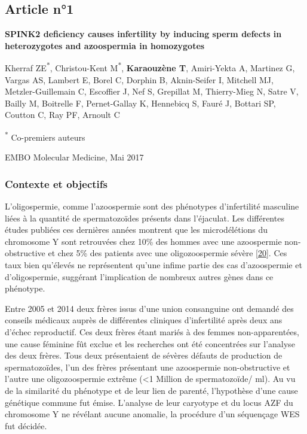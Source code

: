 \documentclass[12pt,a4paper,twoside]{ugathesis}
\begin{document}
\newpage

\newpage  

\subsection{Article n°1}\label{article-n1}

\textbf{SPINK2 deficiency causes infertility by inducing sperm defects
in heterozygotes and azoospermia in homozygotes}

Kherraf ZE\textsuperscript{*}, Christou-Kent M\textsuperscript{*},
\textbf{Karaouzène T}, Amiri-Yekta A, Martinez G, Vargas AS, Lambert E,
Borel C, Dorphin B, Aknin-Seifer I, Mitchell MJ, Metzler-Guillemain C,
Escoffier J, Nef S, Grepillat M, Thierry-Mieg N, Satre V, Bailly M,
Boitrelle F, Pernet-Gallay K, Hennebicq S, Fauré J, Bottari SP, Coutton
C, Ray PF, Arnoult C

\textsuperscript{*} Co-premiers auteurs

EMBO Molecular Medicine, Mai 2017

\newpage

\subsubsection{Contexte et objectifs}\label{contexte-et-objectifs}

L'oligospermie, comme l'azoospermie sont des phénotypes d'infertilité
masculine liées à la quantité de spermatozoïdes présents dans
l'éjaculat. Les différentes études publiées ces dernières années
montrent que les microdélétions du chromosome Y sont retrouvées chez
10\% des hommes avec une azoospermie non-obstructive et chez 5\% des
patients avec une oligozoospermie sévère
{[}\protect\hyperlink{ref-Hotaling2014}{20}{]}. Ces taux bien qu'élevés
ne représentent qu'une infime partie des cas d'azoospermie et
d'oligospermie, suggérant l'implication de nombreux autres gènes dans ce
phénotype.

Entre 2005 et 2014 deux frères issus d'une union consanguine ont demandé
des conseils médicaux auprès de différentes cliniques d'infertilité
après deux ans d'échec reproductif. Ces deux frères étant mariés à des
femmes non-apparentées, une cause féminine fût exclue et les recherches
ont été concentrées sur l'analyse des deux frères. Tous deux
présentaient de sévères défauts de production de spermatozoïdes, l'un
des frères présentant une azoospermie non-obstructive et l'autre une
oligozoospermie extrême (\textless{}1 Million de spermatozoïde/ ml). Au
vu de la similarité du phénotype et de leur lien de parenté, l'hypothèse
d'une cause génétique commune fut émise. L'analyse de leur caryotype et
du locus AZF du chromosome Y ne révélant aucune anomalie, la procédure
d'un séquençage WES fut décidée.
\end{document}
